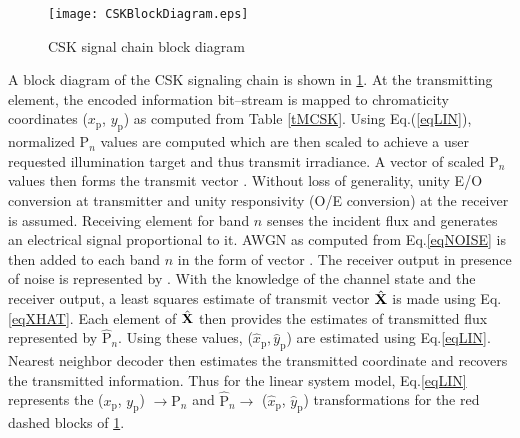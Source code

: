 \begin{figure}[!t]
	\centering
		\texttt{[image: CSKBlockDiagram.eps]}
	\caption{CSK signal chain block diagram}
	\label{figCSKBD}
\end{figure}

A block diagram of the CSK signaling chain is shown in \figurename{ }\ref{figCSKBD}. At the transmitting element, the encoded information bit--stream is mapped to chromaticity coordinates ($x_{\text{p}}$, $y_{\text{p}}$) as computed from Table \ref{tMCSK}. Using Eq.(\ref{eqLIN}), normalized P$_{n}$ values are computed which are then scaled to achieve a user requested illumination target and thus transmit irradiance. A vector of scaled P$_{n}$ values then forms the transmit vector . Without loss of generality, unity E/O conversion at transmitter and unity responsivity (O/E conversion) at the receiver is assumed. Receiving element for band $n$ senses the incident flux and generates an electrical signal proportional to it. AWGN as computed from Eq.\eqref{eqNOISE} is then added to each band $n$ in the form of vector . The receiver output in presence of noise is represented by . With the knowledge of the channel state and the receiver output, a least squares estimate of transmit vector $\hat{{\bf{X}}}$ is made using Eq.\eqref{eqXHAT}. Each element of $\hat{{\bf{X}}}$ then provides the estimates of transmitted flux represented by $\hat{\text{P}}_{n}$. Using these values, ($\hat{x}_{\text{p}}, \hat{y}_{\text{p}}$) are estimated using Eq.\eqref{eqLIN}. Nearest neighbor decoder then estimates the transmitted coordinate and recovers the transmitted information. Thus for the linear system model, Eq.\eqref{eqLIN} represents the ($x_{\text{p}}$, $y_{\text{p}}$) $\rightarrow  \text{P}_{n}$ and $\hat{\text{P}}_{n}\rightarrow$ ($\hat{x}_{\text{p}}$, $\hat{y}_{\text{p}}$) transformations for the red dashed blocks of \figurename{ }\ref{figCSKBD}.

